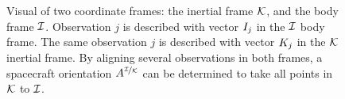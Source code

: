 \documentclass[conference]{IEEEtran}
\begin{document}
\begin{figure}
{

        \caption{
        Visual of two coordinate frames: the inertial frame $\mathcal{K}$, and the body frame $\mathcal{I}$.
        Observation $j$ is described with vector $I_j$ in the $\mathcal{I}$ body frame.
        The same observation $j$ is described with vector $K_j$ in the $\mathcal{K}$ inertial frame.
        By aligning several observations in both frames, a spacecraft orientation $A^{\nicefrac{\mathcal{I}}{\mathcal{K}}}$
        can be determined to take all points in $\mathcal{K}$ to $\mathcal{I}$.
        }
        \label{figure:coordinateSystem}
        }
    \end{figure}
\end{document}
